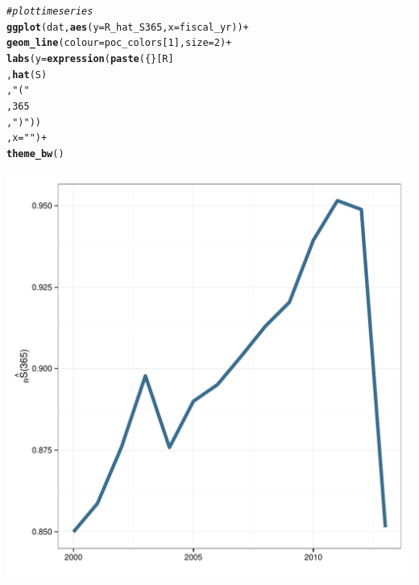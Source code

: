 \documentclass[12pt]{article}\usepackage[]{graphicx}\usepackage[]{color}
\makeatletter
\def\maxwidth{ %
  \ifdim\Gin@nat@width>\linewidth
    \linewidth
  \else
    \Gin@nat@width
  \fi
}
\newcommand{\hlnum}[1]{\textcolor[rgb]{0.686,0.059,0.569}{#1}}%
\newcommand{\hlstr}[1]{\textcolor[rgb]{0.192,0.494,0.8}{#1}}%
\newcommand{\hlcom}[1]{\textcolor[rgb]{0.678,0.584,0.686}{\textit{#1}}}%
\newcommand{\hlopt}[1]{\textcolor[rgb]{0,0,0}{#1}}%
\newcommand{\hlstd}[1]{\textcolor[rgb]{0.345,0.345,0.345}{#1}}%
\newcommand{\hlkwc}[1]{\textcolor[rgb]{0.333,0.667,0.333}{#1}}%
\newcommand{\hlkwd}[1]{\textcolor[rgb]{0.737,0.353,0.396}{\textbf{#1}}}%
\newenvironment{kframe}{%
 \def\at@end@of@kframe{}%
 \ifinner\ifhmode%
  \def\at@end@of@kframe{\end{minipage}}%
  \begin{minipage}{\columnwidth}%
 \fi\fi%
 \def\FrameCommand##1{\hskip\@totalleftmargin \hskip-\fboxsep
 \colorbox{shadecolor}{##1}\hskip-\fboxsep
     \hskip-\linewidth \hskip-\@totalleftmargin \hskip\columnwidth}%
 \MakeFramed {\advance\hsize-\width
   \@totalleftmargin\z@ \linewidth\hsize
   \@setminipage}}%
 {\par\unskip\endMakeFramed%
 \at@end@of@kframe}
\newenvironment{knitrout}{}{} %
\makeatother
\begin{document}
\begin{knitrout}
\begin{kframe}
\begin{alltt}
\hlcom{#plot time series}
\hlkwd{ggplot}\hlstd{(dat,} \hlkwd{aes}\hlstd{(}\hlkwc{y}\hlstd{=R_hat_S365,} \hlkwc{x}\hlstd{=fiscal_yr))} \hlopt{+}
  \hlkwd{geom_line}\hlstd{(}\hlkwc{colour}\hlstd{=poc_colors[}\hlnum{1}\hlstd{],} \hlkwc{size}\hlstd{=}\hlnum{2}\hlstd{)} \hlopt{+}
  \hlkwd{labs}\hlstd{(}\hlkwc{y} \hlstd{=} \hlkwd{expression}\hlstd{(}\hlkwd{paste}\hlstd{(\{\}[R]}
                            \hlstd{,}\hlkwd{hat}\hlstd{(S)}
                            \hlstd{,}\hlstr{"("}
                            \hlstd{,}\hlnum{365}
                            \hlstd{,}\hlstr{")"}\hlstd{))}
       \hlstd{,}\hlkwc{x} \hlstd{=} \hlstr{""}\hlstd{)} \hlopt{+}
  \hlkwd{theme_bw}\hlstd{()}
\end{alltt}
\end{kframe}
\includegraphics[width=\maxwidth]{figure/r_hat_S} 

\end{knitrout}
\end{document}
